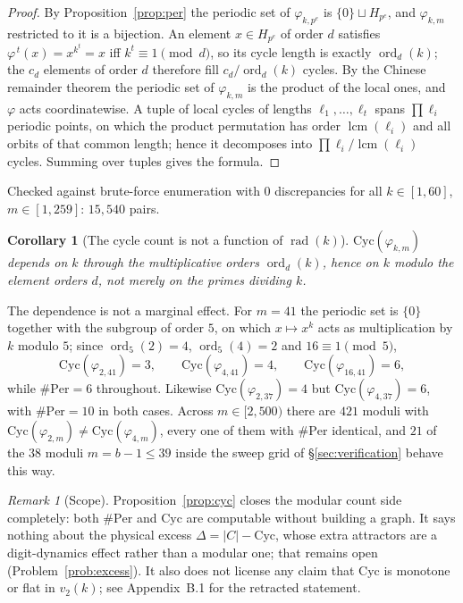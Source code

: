 \documentclass[11pt]{article}
\newtheorem{corollary}[theorem]{Corollary}
\theoremstyle{definition}
\theoremstyle{remark}
\newtheorem{remark}[theorem]{Remark}
\newcommand{\Cyc}{\mathrm{Cyc}}
\newcommand{\Per}{\mathrm{Per}}
\DeclareMathOperator{\ord}{ord}
\DeclareMathOperator{\rad}{rad}
\DeclareMathOperator{\lcmop}{lcm}
\begin{document}
\begin{proof}
By Proposition~\ref{prop:per} the periodic set of $\varphi_{k,p^e}$ is $\{0\} \sqcup H_{p^e}$, and $\varphi_{k,m}$ restricted to it is a bijection. An element $x \in H_{p^e}$ of order $d$ satisfies $\varphi^{\,t}(x) = x^{k^t} = x$ iff $k^t \equiv 1 \pmod d$, so its cycle length is exactly $\ord_d(k)$; the $c_d$ elements of order $d$ therefore fill $c_d/\ord_d(k)$ cycles. By the Chinese remainder theorem the periodic set of $\varphi_{k,m}$ is the product of the local ones, and $\varphi$ acts coordinatewise. A tuple of local cycles of lengths $\ell_1,\dots,\ell_t$ spans $\prod \ell_i$ periodic points, on which the product permutation has order $\lcmop(\ell_i)$ and all orbits of that common length; hence it decomposes into $\prod \ell_i / \lcmop(\ell_i)$ cycles. Summing over tuples gives the formula.
\end{proof}

Checked against brute-force enumeration with 0 discrepancies for all $k \in [1,60]$, $m \in [1,259]$: $15{,}540$ pairs.

\begin{corollary}[The cycle count is not a function of $\rad(k)$]\label{cor:notradical}
$\Cyc(\varphi_{k,m})$ depends on $k$ through the multiplicative orders $\ord_d(k)$, hence on $k$ modulo the element orders $d$, not merely on the primes dividing $k$.
\end{corollary}

The dependence is not a marginal effect. For $m = 41$ the periodic set is $\{0\}$ together with the subgroup of order $5$, on which $x \mapsto x^k$ acts as multiplication by $k$ modulo $5$; since $\ord_5(2) = 4$, $\ord_5(4) = 2$ and $16 \equiv 1 \pmod 5$,
\[
\Cyc(\varphi_{2,41}) = 3, \qquad \Cyc(\varphi_{4,41}) = 4, \qquad \Cyc(\varphi_{16,41}) = 6,
\]
while $\#\Per = 6$ throughout. Likewise $\Cyc(\varphi_{2,37}) = 4$ but $\Cyc(\varphi_{4,37}) = 6$, with $\#\Per = 10$ in both cases. Across $m \in [2,500)$ there are $421$ moduli with $\Cyc(\varphi_{2,m}) \ne \Cyc(\varphi_{4,m})$, every one of them with $\#\Per$ identical, and $21$ of the $38$ moduli $m = b-1 \le 39$ inside the sweep grid of \S\ref{sec:verification} behave this way.

\begin{remark}[Scope]
Proposition~\ref{prop:cyc} closes the modular count side completely: both $\#\Per$ and $\Cyc$ are computable without building a graph. It says nothing about the physical excess $\Delta = |C| - \Cyc$, whose extra attractors are a digit-dynamics effect rather than a modular one; that remains open (Problem~\ref{prob:excess}). It also does not license any claim that $\Cyc$ is monotone or flat in $v_2(k)$; see Appendix~B.1 for the retracted statement.
\end{remark}
\end{document}
